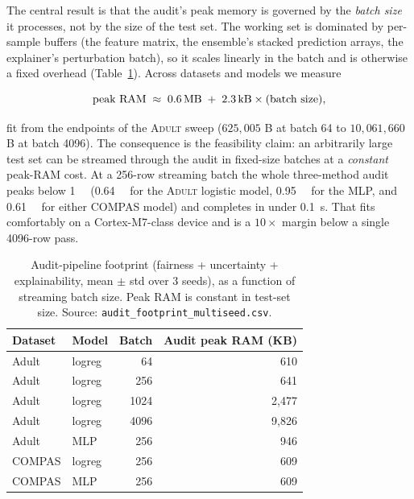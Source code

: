 \documentclass[11pt]{article}
\newcommand{\dataset}[1]{\textsc{#1}}
\begin{document}
The central result is that the audit's peak memory is governed by the
\emph{batch size} it processes, not by the size of the test set. The working set
is dominated by per-sample buffers (the feature matrix, the ensemble's stacked
prediction arrays, the explainer's perturbation batch), so it scales linearly in
the batch and is otherwise a fixed overhead
(Table~\ref{tab:audit-footprint}). Across datasets and models we measure

\begin{equation}
\text{peak RAM} \;\approx\; \SI{0.6}{\mega\byte} \;+\; \SI{2.3}{\kilo\byte}
\times (\text{batch size}),
\label{eq:footprint}
\end{equation}

fit from the endpoints of the \dataset{Adult} sweep ($625{,}005$ B at batch 64 to
$10{,}061{,}660$ B at batch 4096). The consequence is the feasibility claim: an
arbitrarily large test set can be streamed through the audit in fixed-size
batches at a \emph{constant} peak-RAM cost. At a 256-row streaming batch the whole
three-method audit peaks below \SI{1}{\mega\byte} (\SI{0.64}{\mega\byte} for the
\dataset{Adult} logistic model, \SI{0.95}{\mega\byte} for the MLP, and
\SI{0.61}{\mega\byte} for either \dataset{COMPAS} model) and completes in under
\SI{0.1}{\second}. That fits comfortably on a Cortex-M7-class device and is a
$10\times$ margin below a single \SI{4096}{}-row pass.

\begin{table}[t]
\centering
\caption{Audit-pipeline footprint (fairness + uncertainty + explainability,
mean $\pm$ std over 3 seeds), as a function of streaming batch size. Peak RAM is
constant in test-set size. Source: \texttt{audit\_footprint\_multiseed.csv}.}
\label{tab:audit-footprint}
\begin{tabular}{llrr}
\toprule
Dataset & Model & Batch & Audit peak RAM (KB) \\
\midrule
Adult   & logreg & 64   & 610 \\
Adult   & logreg & 256  & 641 \\
Adult   & logreg & 1024 & 2{,}477 \\
Adult   & logreg & 4096 & 9{,}826 \\
Adult   & MLP    & 256  & 946 \\
COMPAS  & logreg & 256  & 609 \\
COMPAS  & MLP    & 256  & 609 \\
\bottomrule
\end{tabular}
\end{table}
\end{document}
